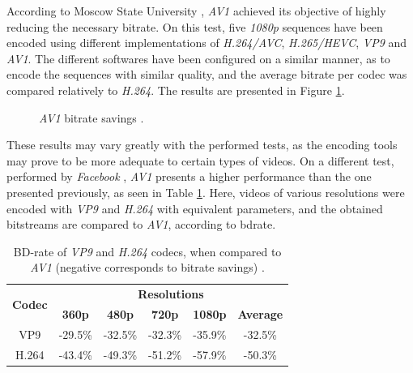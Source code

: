 
According to Moscow State University \cite{vatolinMSUCodecComparison2019}, \emph{AV1} achieved its objective of highly reducing the necessary bitrate. On this test, five \emph{1080p} sequences have been encoded using different implementations of \emph{H.264/AVC}, \emph{H.265/HEVC}, \emph{VP9} and \emph{AV1}. The different softwares have been configured on a similar manner, as to encode the sequences with similar quality, and the average bitrate per codec was compared relatively to \emph{H.264}. The results are presented in Figure \ref{fig:testqual}.

\begin{figure}[!htbp]
    \centering
    
    \caption[\emph{AV1} bitrate savings]{\emph{AV1} bitrate savings \cite{vatolinMSUCodecComparison2019}.} 
    \label{fig:testqual}
\end{figure}

These results may vary greatly with the performed tests, as the encoding tools may prove to be more adequate to certain types of videos. On a different test, performed by \emph{Facebook} \cite{AV1BeatsX2642018}, \emph{AV1} presents a higher performance than the one presented previously, as seen in Table \ref{tab:facetest}. Here, videos of various resolutions were encoded with \emph{VP9} and \emph{H.264} with equivalent parameters, and the obtained bitstreams are compared to \emph{AV1}, according to \gls{bdrate}.

\begin{table}[!htpb]
    \centering
    \caption[BD-rate of \emph{VP9} and \emph{H.264} codecs, when compared to \emph{AV1} (negative corresponds to bitrate savings)]{BD-rate of \emph{VP9} and \emph{H.264} codecs, when compared to \emph{AV1} (negative corresponds to bitrate savings) \cite{AV1BeatsX2642018}.}
    \begin{tabular}{@{}cccccc@{}} \toprule
        \multirow{2}{*}{\textbf{Codec}}     &      \multicolumn{5}{c}{\textbf{Resolutions}} \\
         & \textbf{360p} & \textbf{480p} & \textbf{720p} & \textbf{1080p} & \textbf{Average}\\ \toprule 
        VP9            &    -29.5\% & -32.5\% & -32.3\% & -35.9\% & -32.5\% \\ \hline
        H.264          &    -43.4\% & -49.3\% & -51.2\% & -57.9\% & -50.3\% \\
        \bottomrule
    \end{tabular}    
    \label{tab:facetest}
\end{table}

